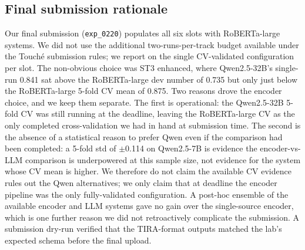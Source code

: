 \subsection{Final submission rationale}
\label{sec:final-submission}

Our final submission (\texttt{exp\_0220}) populates all six slots with RoBERTa-large systems. %
We did not use the additional two-runs-per-track budget available under the Touch\'{e} submission rules; we report on the single CV-validated configuration per slot. The non-obvious choice was ST3 enhanced, where Qwen2.5-32B's single-run 0.841 sat above the RoBERTa-large dev number of 0.735 but only just below the RoBERTa-large 5-fold CV mean of 0.875. %
Two reasons drove the encoder choice, and we keep them separate. The first is operational: the Qwen2.5-32B 5-fold CV was still running at the deadline, leaving the RoBERTa-large CV as the only completed cross-validation we had in hand at submission time. The second is the absence of a statistical reason to prefer Qwen even if the comparison had been completed: a 5-fold std of $\pm$0.114 on Qwen2.5-7B is evidence the encoder-vs-LLM comparison is underpowered at this sample size, not evidence for the system whose CV mean is higher. %
We therefore do not claim the available CV evidence rules out the Qwen alternatives; we only claim that at deadline the encoder pipeline was the only fully-validated configuration. A post-hoc ensemble of the available encoder and LLM systems gave no gain over the single-source encoder, which is one further reason we did not retroactively complicate the submission. %
A submission dry-run verified that the TIRA-format outputs matched the lab's expected schema before the final upload. %
